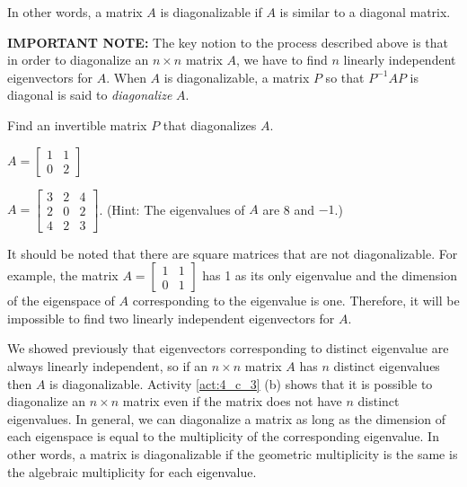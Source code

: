 In other words, a matrix $A$ is diagonalizable if $A$ is similar to a diagonal matrix. 



\noindent \textbf{IMPORTANT NOTE:} The key notion to the process described above is that in order to diagonalize an $n\times n$ matrix $A$, we have to find $n$ linearly independent eigenvectors for $A$. When $A$ is diagonalizable, a matrix $P$ so that $P^{-1}AP$ is diagonal is said to \emph{diagonalize} $A$.



\begin{activity} \label{act:4_c_3} Find an invertible matrix $P$ that diagonalizes $A$.
    \ba
    \item $A = \left[ \begin{array}{cc} 1&1 \\ 0&2 \end{array} \right]$

    

    \item $A = \left[ \begin{array}{ccc} 3&2&4 \\ 2&0&2 \\ 4&2&3 \end{array} \right]$. (Hint: The eigenvalues of $A$ are 8 and $-1$.)

    

    \ea
\end{activity}


It should be noted that there are square matrices that are not diagonalizable. For example, the matrix $A = \left[ \begin{array}{cc} 1&1 \\ 0&1 \end{array} \right]$ has 1 as its only eigenvalue and the dimension of the eigenspace of $A$ corresponding to the eigenvalue is one. Therefore, it will be impossible to find two linearly independent eigenvectors for $A$.

We showed previously that eigenvectors corresponding to distinct eigenvalue are always linearly independent, so if an $n \times n$ matrix $A$ has $n$ distinct eigenvalues then $A$ is diagonalizable. Activity \ref{act:4_c_3} (b) shows that it is possible to diagonalize an $n \times n$ matrix even if the matrix does not have $n$ distinct eigenvalues. In general, we can diagonalize a matrix as long as the dimension of each eigenspace is equal to the multiplicity of the corresponding eigenvalue. In other words, a matrix is diagonalizable if the geometric multiplicity is the same is the algebraic multiplicity for each eigenvalue. 


